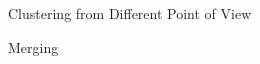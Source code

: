 \begin{subsection}{Clustering from Different Point of View}
\begin{subsubsection}{Merging}



\end{subsubsection}

\end{subsection}



